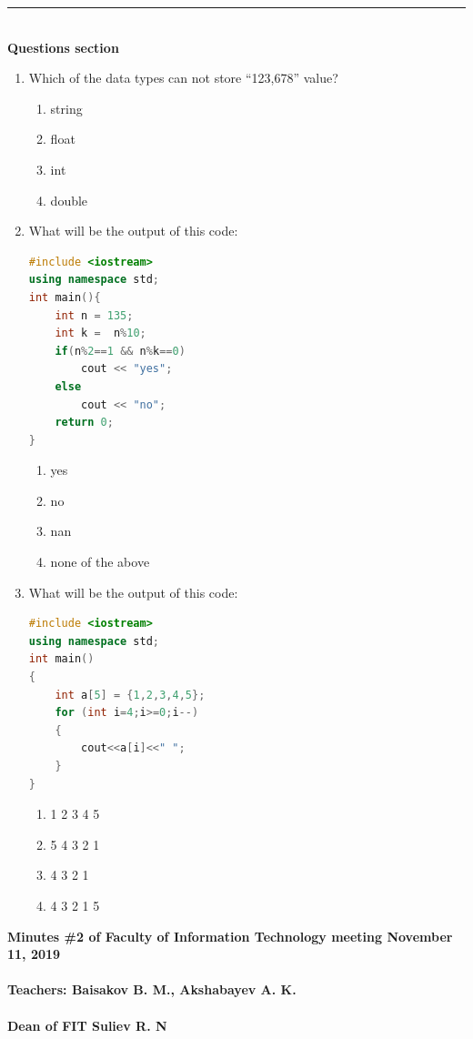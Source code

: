 \documentclass[10pt]{article}
\begin{document}
\medskip\hrule
\textbf{
\\
{Questions section}\\
}
\begin{enumerate}

\item Which of the data types can not store “123,678” value?
\begin{multicols}{4}
\begin{enumerate}
    \item string
    \item float
    \item int
    \item double
\end{enumerate}
\end{multicols}




\item What will be the output of this code:
\begin{lstlisting}[language=C++]
#include <iostream>
using namespace std;
int main(){
    int n = 135;
    int k =  n%10;
    if(n%2==1 && n%k==0)
        cout << "yes";
    else
        cout << "no";
    return 0;
}

\end{lstlisting}
\begin{multicols}{4}
\begin{enumerate}
    \item yes
    \item no
    \item nan
    \item none of the above
\end{enumerate}
\end{multicols}





\item What will be the output of this code:
\begin{lstlisting}[language=C++]
#include <iostream>
using namespace std;
int main()
{
    int a[5] = {1,2,3,4,5};
    for (int i=4;i>=0;i--)
    {
        cout<<a[i]<<" ";
    }
}

\end{lstlisting}
\begin{multicols}{4}
\begin{enumerate}
    \item 1 2 3 4 5
    \item 5 4 3 2 1
    \item 4 3 2 1
    \item 4 3 2 1 5
\end{enumerate}
\end{multicols}





\end{enumerate}
\textbf{
Minutes \#2 of Faculty of Information Technology meeting November 11, 2019 \\\\
Teachers: Baisakov B. M., Akshabayev A. K. \\\\ 
Dean of FIT Suliev R. N \\\\
}
\end{document}
